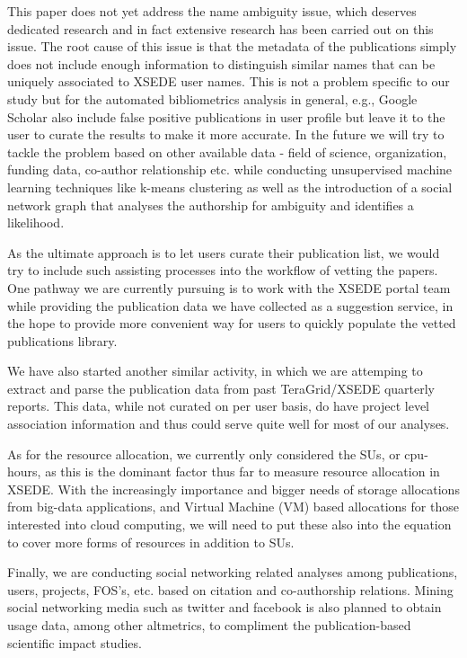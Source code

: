 \documentclass{sig-alternate}
\begin{document}
This paper does not yet address the name ambiguity issue, which deserves dedicated research and in fact extensive research has been carried out on this issue. The root cause of this issue is that the metadata of the publications simply does not include enough information to distinguish similar names that can be uniquely associated to XSEDE user names. This is not a problem specific to our study but for the automated bibliometrics analysis in general, e.g., Google Scholar also include false positive publications in user profile but leave it to the user to curate the results to make it more accurate. In the future we will try to tackle the problem based on other available data - field of science, organization, funding data, co-author relationship etc. while conducting unsupervised machine learning techniques like k-means clustering as well as the introduction of a social network graph that analyses the authorship for ambiguity and identifies a likelihood.
 
As the ultimate approach is to let users curate their publication list, we would try to include such assisting processes into the workflow of vetting the papers. One pathway we are currently pursuing is to work with the XSEDE portal team while providing the publication data we have collected as a suggestion service, in the hope to provide more convenient way for users to quickly populate the vetted publications library. 
 
We have also started another similar activity, in which we are attemping to  extract and parse the publication data from past TeraGrid/XSEDE quarterly reports. This data, while not curated on per user basis, do have project level association information and thus could serve quite well for most of our analyses. 

As for the resource allocation, we currently only considered the SUs, or cpu-hours, as this is the dominant factor thus far to measure resource allocation in XSEDE. With the increasingly importance and bigger needs of storage allocations from big-data applications, and Virtual Machine (VM) based allocations for those interested into cloud computing, we will need to put these also into the equation to cover more forms of resources in addition to SUs.

Finally, we are conducting social networking related analyses among publications, users, projects, FOS's, etc. based on citation and co-authorship relations. Mining social networking media such as twitter and facebook is also planned to obtain usage data, among other altmetrics, to compliment the publication-based scientific impact studies.
\end{document}
